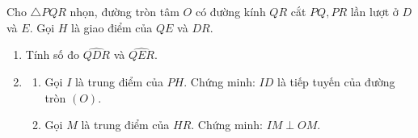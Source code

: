 \begin{ex}
	Cho $\triangle PQR$ nhọn, đường tròn tâm $O$ có đường kính $QR$ cắt $PQ, PR$ lần lượt ở $D$ và $E$. Gọi $H$ là giao điểm của $QE$ và $DR$.
	\begin{enumerate}
		\item[1)] Tính số đo $\widehat{QDR}$ và $\widehat{QER}$.
		\item[2)] 
		\begin{enumerate}
			\item[a)] Gọi $I$ là trung điểm của $PH$. Chứng minh: $ID$ là tiếp tuyến của đường tròn $(O)$.
			\item[b)] Gọi $M$ là trung điểm của $HR$. Chứng minh: $IM \perp OM$.
		\end{enumerate}
	\end{enumerate}
\end{ex}
